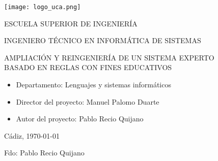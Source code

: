 

\begin{center}

  \texttt{[image: logo\_uca.png]} \\

  \vspace{2.0cm}

  \Large{ESCUELA SUPERIOR DE INGENIERÍA} \\

  \vspace{1.0cm}

  \large{INGENIERO TÉCNICO EN INFORMÁTICA DE SISTEMAS} \\

  \vspace{2.0cm}

  \Large{AMPLIACIÓN Y REINGENIERÍA DE UN SISTEMA EXPERTO\\BASADO EN REGLAS CON FINES EDUCATIVOS} \\

  \vspace{1.0cm}

\end{center}

\begin{itemize}
\item \large{Departamento: Lenguajes y sistemas informáticos}
\item \large{Director del proyecto: Manuel Palomo Duarte}
\item \large{Autor del proyecto: Pablo Recio Quijano}
\end{itemize}

\vspace{1.0cm}

\begin{flushright}
  \large{Cádiz, \today} \\

  \vspace{2.5cm}

  \large{Fdo: Pablo Recio Quijano}
\end{flushright}
